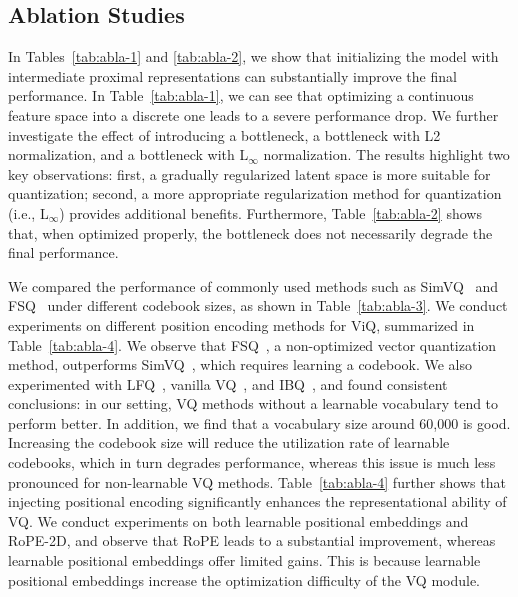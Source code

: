 \subsection{Ablation Studies}

In Tables~\ref{tab:abla-1} and \ref{tab:abla-2}, we show that initializing the model with intermediate proximal representations can substantially improve the final performance.
In Table~\ref{tab:abla-1}, we can see that optimizing a continuous feature space into a discrete one leads to a severe performance drop. We further investigate the effect of introducing a bottleneck, a bottleneck with L2 normalization, and a bottleneck with L$_\infty$ normalization. The results highlight two key observations: first, a gradually regularized latent space is more suitable for quantization; second, a more appropriate regularization method for quantization (i.e., L$_\infty$) provides additional benefits. Furthermore, Table~\ref{tab:abla-2} shows that, when optimized properly, the bottleneck does not necessarily degrade the final performance.

We compared the performance of commonly used methods such as SimVQ~\cite{zhu2025addressing} and FSQ~\cite{mentzerfinite} under different codebook sizes, as shown in Table~\ref{tab:abla-3}. We conduct experiments on different position encoding methods for ViQ, summarized in Table~\ref{tab:abla-4}. We observe that FSQ~\cite{mentzerfinite}, a non-optimized vector quantization method, outperforms SimVQ~\cite{zhu2025addressing}, which requires learning a codebook. We also experimented with LFQ~\cite{yulanguage}, vanilla VQ~\cite{gersho2012vector}, and IBQ~\cite{shi2025scalable}, and found consistent conclusions: in our setting, VQ methods without a learnable vocabulary tend to perform better. In addition, we find that a vocabulary size around 60,000 is good. Increasing the codebook size will reduce the utilization rate of learnable codebooks, which in turn degrades performance, whereas this issue is much less pronounced for non-learnable VQ methods. Table~\ref{tab:abla-4} further shows that injecting positional encoding significantly enhances the representational ability of VQ. We conduct experiments on both learnable positional embeddings and RoPE-2D, and observe that RoPE leads to a substantial improvement, whereas learnable positional embeddings offer limited gains. This is because learnable positional embeddings increase the optimization difficulty of the VQ module.

